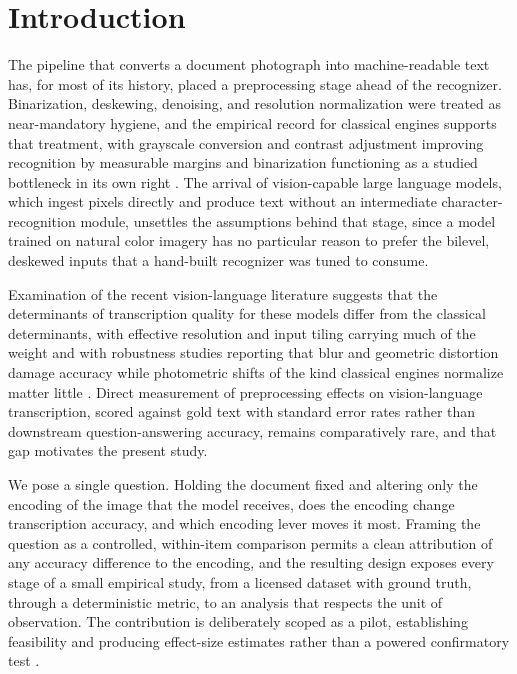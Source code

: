\documentclass[11pt]{article}
\begin{document}
\section{Introduction}

The pipeline that converts a document photograph into machine-readable text has, for most of its
history, placed a preprocessing stage ahead of the recognizer. Binarization, deskewing, denoising,
and resolution normalization were treated as near-mandatory hygiene, and the empirical record for
classical engines supports that treatment, with grayscale conversion and contrast adjustment
improving recognition by measurable margins and binarization functioning as a studied bottleneck in
its own right \citep{otsu1979threshold,smith2007tesseract}. The arrival of vision-capable large
language models, which ingest pixels directly and produce text without an intermediate
character-recognition module, unsettles the assumptions behind that stage, since a model trained on
natural color imagery has no particular reason to prefer the bilevel, deskewed inputs that a
hand-built recognizer was tuned to consume.

Examination of the recent vision-language literature suggests that the determinants of transcription
quality for these models differ from the classical determinants, with effective resolution and
input tiling carrying much of the weight \citep{liu2024llavanext,wang2024qwen2vl} and with
robustness studies reporting that blur and geometric distortion damage accuracy while photometric
shifts of the kind classical engines normalize matter little \citep{usama2025robustness}. Direct
measurement of preprocessing effects on vision-language transcription, scored against gold text with
standard error rates rather than downstream question-answering accuracy, remains comparatively rare,
and that gap motivates the present study.

We pose a single question. Holding the document fixed and altering only the encoding of the image
that the model receives, does the encoding change transcription accuracy, and which encoding lever
moves it most. Framing the question as a controlled, within-item comparison permits a clean
attribution of any accuracy difference to the encoding, and the resulting design exposes every stage
of a small empirical study, from a licensed dataset with ground truth, through a deterministic
metric, to an analysis that respects the unit of observation. The contribution is deliberately
scoped as a pilot, establishing feasibility and producing effect-size estimates rather than a
powered confirmatory test \citep{leon2011pilot}.
\end{document}
